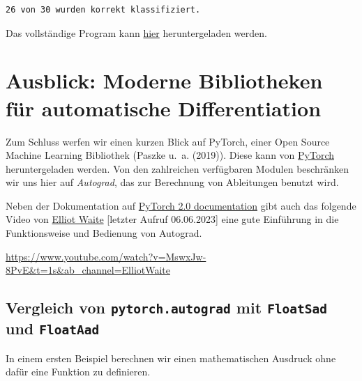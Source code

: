 \documentclass[
  a4paper,
  DIV=11]{scrreprt}
\theoremstyle{definition}
\theoremstyle{definition}
\theoremstyle{remark}
\begin{document}
\begin{verbatim}
26 von 30 wurden korrekt klassifiziert.
\end{verbatim}

Das vollständige Program kann \href{FisherClassification.py}{hier}
heruntergeladen werden.


\hypertarget{sec-ausblick}{%
\chapter{Ausblick: Moderne Bibliotheken für automatische
Differentiation}\label{sec-ausblick}}

Zum Schluss werfen wir einen kurzen Blick auf PyTorch, einer Open Source
Machine Learning Bibliothek (Paszke u.~a. (2019)). Diese kann von
\href{https://pytorch.org/}{PyTorch} heruntergeladen werden. Von den
zahlreichen verfügbaren Modulen beschränken wir uns hier auf
\emph{Autograd}, das zur Berechnung von Ableitungen benutzt wird.

Neben der Dokumentation auf
\href{https://pytorch.org/docs/stable/autograd.html}{PyTorch 2.0
documentation} gibt auch das folgende Video von
\href{https://www.youtube.com/@elliotwaite}{Elliot Waite} {[}letzter
Aufruf 06.06.2023{]} eine gute Einführung in die Funktionsweise und
Bedienung von Autograd.

\url{https://www.youtube.com/watch?v=MswxJw-8PvE\&t=1s\&ab_channel=ElliotWaite}

\hypertarget{vergleich-von-pytorch.autograd-mit-floatsad-und-floataad}{%
\section{\texorpdfstring{Vergleich von \texttt{pytorch.autograd} mit
\texttt{FloatSad} und
\texttt{FloatAad}}{Vergleich von pytorch.autograd mit FloatSad und FloatAad}}\label{vergleich-von-pytorch.autograd-mit-floatsad-und-floataad}}

In einem ersten Beispiel berechnen wir einen mathematischen Ausdruck
ohne dafür eine Funktion zu definieren.
\end{document}
